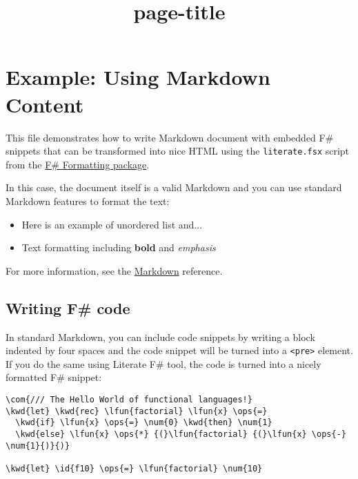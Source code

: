 \documentclass{article}
\title{{page-title}}
\date{}
\newcommand{\id}[1]{\textcolor{black}{#1}}
\newcommand{\com}[1]{\textcolor{officegreen}{#1}}
\newcommand{\kwd}[1]{\textcolor{navy}{#1}}
\newcommand{\num}[1]{\textcolor{officegreen}{#1}}
\newcommand{\ops}[1]{\textcolor{purple}{#1}}
\begin{document}
\maketitle


\section*{Example: Using Markdown Content}



This file demonstrates how to write Markdown document with
embedded F\# snippets that can be transformed into nice HTML
using the \texttt{literate.fsx} script from the \href{http://fsprojects.github.io/FSharp.Formatting}{F\# Formatting
package}.


In this case, the document itself is a valid Markdown and
you can use standard Markdown features to format the text:
\begin{itemize}
\item Here is an example of unordered list and...

\item Text formatting including \textbf{bold} and \emph{emphasis}

\end{itemize}



For more information, see the \href{http://daringfireball.net/projects/markdown}{Markdown} reference.
\subsection*{Writing F\# code}



In standard Markdown, you can include code snippets by
writing a block indented by four spaces and the code
snippet will be turned into a \texttt{<pre>} element. If you do
the same using Literate F\# tool, the code is turned into
a nicely formatted F\# snippet:
\begin{Verbatim}[commandchars=\\\{\}]
\com{/// The Hello World of functional languages!}
\kwd{let} \kwd{rec} \lfun{factorial} \lfun{x} \ops{=} 
  \kwd{if} \lfun{x} \ops{=} \num{0} \kwd{then} \num{1} 
  \kwd{else} \lfun{x} \ops{*} {(}\lfun{factorial} {(}\lfun{x} \ops{-} \num{1}{)}{)}

\kwd{let} \id{f10} \ops{=} \lfun{factorial} \num{10}

\end{Verbatim}
\end{document}
